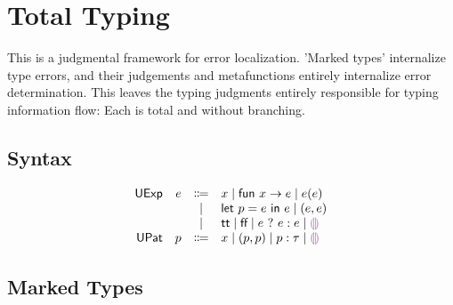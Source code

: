 \documentclass{article}
\makeatletter
\renewcommand\tableofcontents{%
    \@starttoc{toc}%
}
\makeatother
\begin{document}
\tableofcontents

\renewcommand{\thesection}{\Alph{section}}
\section{Total Typing}
This is a judgmental framework for error localization. 'Marked types' internalize type errors, and their judgements and metafunctions entirely internalize error determination. This leaves the typing judgments entirely responsible for typing information flow: Each is total and without branching.

\subsection{Syntax}
\[\begin{array}{rrcl}
  \EMName  & \EMV  & \Coloneqq & x \mid \EFun{x}{\EMV} \mid {\EMV}({\EMV}) \\
           &       & \mid         &
           \ELet{p}{\EMV}{\EMV} \mid
           \EPair{\EMV}{\EMV} \\
           &       & \mid         &
           \ETrue \mid
           \EFalse \mid
           \EIf{\EMV}{\EMV}{\EMV} \mid
           \EEHole \\
  \PMName  & \PMV  & \Coloneqq & x 
                     \mid           \EPair{\PMV}{\PMV}
                     \mid           \PMV : \TMV
                     \mid           \EEHole \\
\end{array}\]


\newpage

\subsection{Marked Types}
\end{document}
